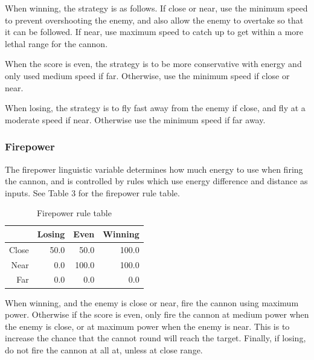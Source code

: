 When winning, the strategy is as follows. If close or near, use the minimum speed to prevent overshooting the enemy, and also allow the enemy to overtake so that it can be followed. If near, use maximum speed to catch up to get within a more lethal range for the cannon.

When the score is even, the strategy is to be more conservative with energy and only used medium speed if far. Otherwise, use the minimum speed if close or near.

When losing, the strategy is to fly fast away from the enemy if close, and fly at a moderate speed if near. Otherwise use the minimum speed if far away.

\subsubsection{Firepower}

The firepower linguistic variable determines how much energy to use when firing the cannon, and is controlled by rules which use energy difference and distance as inputs. See Table 3 for the firepower rule table.

\begin{table}[H]
\centering
\caption{Firepower rule table}
\label{Firepower rule table}
\begin{tabular}{r|r|r|r}
 		& Losing 	& Even 		& Winning	\\ \hline
Close	& 50.0		& 50.0 		& 100.0		\\
Near	& 0.0 		& 100.0 	& 100.0		\\
Far		& 0.0 		& 0.0 		& 0.0		\\
\end{tabular}
\end{table}

When winning, and the enemy is close or near, fire the cannon using maximum power. Otherwise if the score is even, only fire the cannon at medium power when the enemy is close, or at maximum power when the enemy is near. This is to increase the chance that the cannot round will reach the target. Finally, if losing, do not fire the cannon at all at, unless at close range.